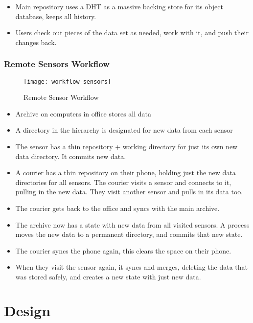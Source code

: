 \documentclass[a4paper]{article}
\begin{document}
  \begin{itemize}
  \item
    Main repository uses a DHT as a massive backing store for its object
    database, keeps all history.
  \item
    Users check out pieces of the data set as needed, work with it, and
    push their changes back.
  \end{itemize}

\subsubsection{Remote Sensors Workflow}

  \begin{figure}[h]
    \caption{Remote Sensor Workflow}
    \label{fig:workflow-sensors}
    \centering
      \texttt{[image: workflow-sensors]}
  \end{figure}

  \begin{itemize}
  \item
    Archive on computers in office stores all data
  \item
    A directory in the hierarchy is designated for new data from each sensor
  \item
    The sensor has a thin repository + working directory for just its own new
    data directory. It commits new data.
  \item
    A courier has a thin repository on their phone, holding just the new data
    directories for all sensors. The courier visits a sensor and connects to it,
    pulling in the new data. They visit another sensor and pulls in its data
    too.
  \item
    The courier gets back to the office and syncs with the main archive.
  \item
    The archive now has a state with new data from all visited sensors. A
    process moves the new data to a permanent directory, and commits that new
    state.
  \item
    The courier syncs the phone again, this clears the space on their phone.
  \item
    When they visit the sensor again, it syncs and merges, deleting the data
    that was stored safely, and creates a new state with just new data.
  \end{itemize}


\section{Design}\label{design}
\end{document}
